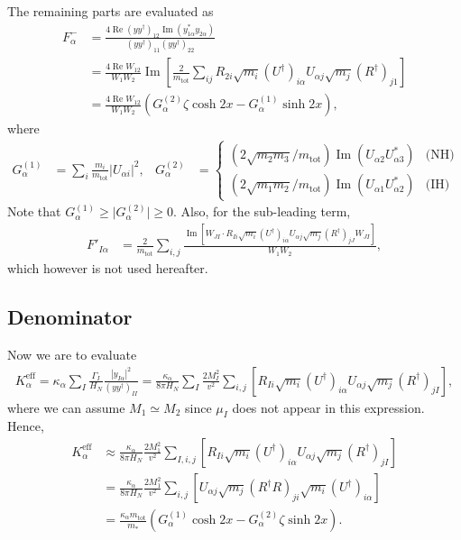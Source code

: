 \documentclass[a4paper,11pt,captions=tableheading,DIV=12]{scrartcl}
\numberwithin{equation}{section}
\newcommand\abs[1]{\lvert#1\rvert}
\newcommand\Abs[1]{\left\lvert#1\right\rvert}
\renewcommand{\Re}{\mathop{\mathrm{Re}}}
\renewcommand{\Im}{\mathop{\mathrm{Im}}}
\newcommand\mtot{m_{\mathrm{tot}}}
\newcommand\yydag{(yy^\dagger)}
\begin{document}
The remaining parts are evaluated as
\begin{align}
 F^-_\alpha
&=
\frac{4\Re\yydag_{12}\Im(y_{1\alpha}^*y_{2\alpha})}{\yydag_{11}\yydag_{22}}
\\&=
\frac{4 \Re W_{12}}{W_1 W_2}\Im\left[
  \frac{2}{\mtot}
  \sum_{ij}
  R_{2i}\sqrt{m_i}(U^\dagger)_{i\alpha} U_{\alpha j}\sqrt{m_j}(R^\dagger)_{j1}
  \right]
\\&=
\frac{4 \Re W_{12}}{W_1 W_2}\left(G_\alpha^{(2)}\zeta\cosh2x - G_\alpha^{(1)}\sinh2x\right),
\end{align}
where
\begin{align}
  G^{(1)}_\alpha
&= \sum_i \frac{m_i}{\mtot}\Abs{U_{\alpha i}}^2,
&
  G^{(2)}_\alpha
&=
\begin{cases}
\left({2\sqrt{m_2m_3}}/{\mtot}\right)\Im\left(U_{\alpha2}U^*_{\alpha3}\right) & \text{(NH)}\\
\left({2\sqrt{m_1m_2}}/{\mtot}\right)\Im\left(U_{\alpha1}U^*_{\alpha2}\right) & \text{(IH)}
\end{cases}
\end{align}
Note that $G_\alpha^{(1)}\ge \abs{G_\alpha^{(2)}} \ge 0$.
Also, for the sub-leading term,
\begin{align}
 F'_{I\alpha}
&=
\frac{2}{\mtot}\sum_{i,j}
\frac{\Im\left[W_{JI}\cdot
R_{Ii}\sqrt{m_i}(U^\dagger)_{i\alpha}U_{\alpha j}\sqrt{m_j}(R^\dagger)_{jJ}
 W_{JI}\right]}
{W_1 W_2},
\end{align}
which however is not used hereafter.

\subsection{Denominator}
Now we are to evaluate
\begin{align}
 K_\alpha^{\mathrm{eff}}
= \kappa_\alpha \sum_I \frac{\Gamma_I}{H_N}\frac{|y_{I\alpha}|^2}{(yy^\dagger)_{II}}
=
\frac{\kappa_\alpha}{8\pi H_N} \sum_I \frac{2M_I^2}{v^2}\sum_{i,j}\left[
R_{Ii}\sqrt{m_i}(U^\dagger)_{i\alpha}U_{\alpha j}\sqrt{m_j}(R^\dagger)_{jI}
\right],
\end{align}
where we can assume $M_1\simeq M_2$ since $\mu_I$ does not appear in this expression.
Hence,
\begin{align}
 K_\alpha^{\mathrm{eff}}
&\approx
\frac{\kappa_\alpha}{8\pi H_N} \frac{2M_1^2}{v^2}\sum_{I,i,j}\left[
R_{Ii}\sqrt{m_i}(U^\dagger)_{i\alpha}U_{\alpha j}\sqrt{m_j}(R^\dagger)_{jI}
\right]\\
&=
\frac{\kappa_\alpha}{8\pi H_N} \frac{2M_1^2}{v^2}\sum_{i,j}\left[
U_{\alpha j}\sqrt{m_j}(R^\dagger R)_{ji}\sqrt{m_i}(U^\dagger)_{i\alpha}
\right]
\\&=
\frac{\kappa_\alpha \mtot}{m_*}
\left(
G_\alpha^{(1)}\cosh2x - G_\alpha^{(2)}\zeta\sinh2x
\right).
\end{align}
\end{document}
